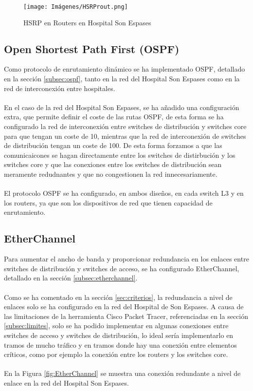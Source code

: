 \begin{figure}[H]
    \centering
    \texttt{[image: Imágenes/HSRProut.png]}
    \caption{HSRP en Routers en Hospital Son Espases}
    \label{fig:HSRPRou}
\end{figure}

\subsection{Open Shortest Path First (OSPF)}
Como protocolo de enrutamiento dinámico se ha implementado OSPF, detallado en la sección \ref{subsec:ospf}, 
tanto en la red del Hospital Son Espases como en la red de interconexión entre hospitales. 
\\ \\
En el caso de la red del Hospital Son Espases, se ha añadido una configuración extra, que permite definir el coste de las rutas OSPF, de esta forma se ha configurado la red de 
interconexión entre switches de distribución y switches core para que tengan un coste de 10, mientras que la red de interconexión de switches de distribución tengan un coste de 100. De
 esta forma forzamos a que las comunicaicones se hagan directamente entre los switches de distirbución y los switches core y que las conexiones entre los switches de distribución sean meramente redudnantes y que no 
congestionen la red innecesariamente.
\\ \\
El protocolo OSPF se ha configurado, en ambos diseños, en cada switch L3 y en los routers, ya que son los dispositivos de red que tienen capacidad de enrutamiento.

\subsection{EtherChannel}
Para aumentar el ancho de banda y proporcionar redundancia en los enlaces entre switches de distribución y switches de acceso, se ha configurado EtherChannel, detallado en la sección \ref{subsec:etherchannel}.
\\ \\
Como se ha comentado en la sección \ref{sec:criterios}, la redundancia a nivel de enlaces solo se ha configurado en la red del Hospital de Son Espases. A causa de las limitaciones de la herramienta Cisco Packet Tracer, referenciadas en la sección \ref{subsec:limites},
solo se ha podido implementar en algunas conexiones entre switches de acceso y switches de distribución, lo ideal sería implementarlo en tramos de mucho tráfico y en tramos donde hay una conexión entre elementos críticos, como por ejemplo la conexión entre los routers y los switches core.
\\ \\
En la Figura \ref{fig:EtherChannel} se muestra una conexión redundante a nivel de enlace en la red del Hospital Son Espases.

